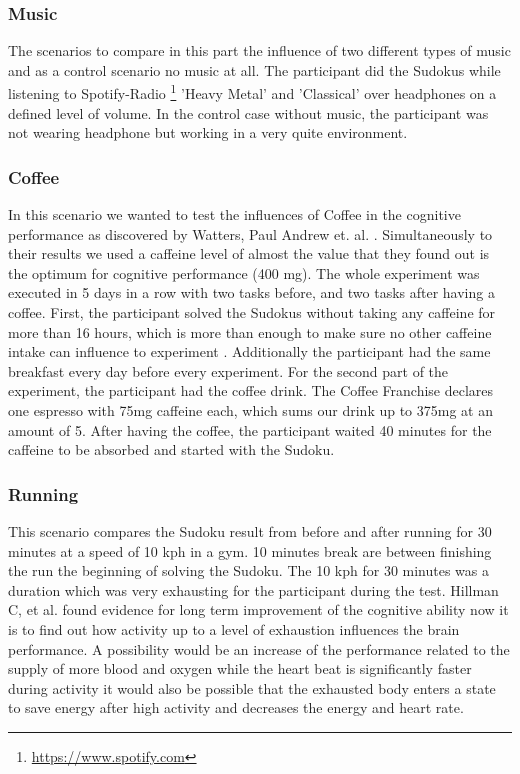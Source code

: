 \subsubsection{Music}
The scenarios to compare in this part the influence of two different types of music and as a control scenario no music at all. The participant did the Sudokus while listening to Spotify-Radio \footnote{\url{https://www.spotify.com}} 'Heavy Metal' and 'Classical' over headphones on a defined level of volume. In the control case without music, the participant was not wearing headphone but working in a very quite environment.

\subsubsection{Coffee}
In this scenario we wanted to test the influences of Coffee in the cognitive performance as discovered by Watters, Paul Andrew et. al. \cite{watters1997caffeine}. Simultaneously to their results we used a caffeine level of almost the value that they found out is the optimum for cognitive performance (400 mg). 
The whole experiment was executed in 5 days in a row with two tasks before, and two tasks after having a coffee. 
First, the participant solved the Sudokus without taking any caffeine for more than 16 hours, which is more than enough to make sure no other caffeine intake can influence to experiment \cite{liguori1997absorption}. Additionally the participant had the same breakfast every day before every experiment. 
For the second part of the experiment, the participant had the coffee drink. The Coffee Franchise declares one espresso with 75mg caffeine each, which sums our drink up to 375mg at an amount of 5. After having the coffee, the participant waited 40 minutes for the caffeine to be absorbed \cite{liguori1997absorption} and started with the Sudoku. 

\subsubsection{Running}
This scenario compares the Sudoku result from before and after running for 30 minutes at a speed of 10 kph in a gym. 10 minutes break are between finishing the run the beginning of solving the Sudoku. The 10 kph for 30 minutes was a duration which was very exhausting for the participant during the test. 
Hillman C, et al. \cite{hillman2008smart} found evidence for long term improvement of the cognitive ability now it is to find out how activity up to a level of exhaustion influences the brain performance. A possibility would be an increase of the performance related to the supply of more blood and oxygen while the heart beat is significantly faster during activity it would also be possible that the exhausted body enters a state to save energy after high activity and decreases the energy and heart rate. 

